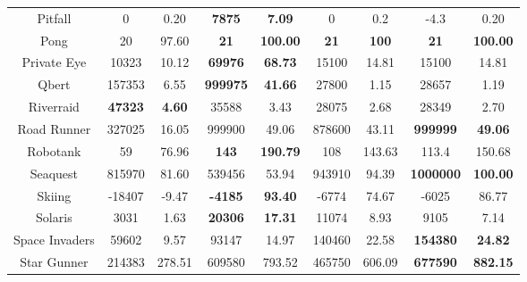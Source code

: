 \documentclass[nohyperref]{article}
\newcommand{\best}[1]{\textbf{#1}}
\theoremstyle{plain}
\begin{document}
\begin{table}[!hb]
\begin{center}
\begin{tabular}{| c | c c |c c |c c |c c |}
 Pitfall        &0             &0.20                   &\textbf{7875}          &\textbf{7.09   }               & 0                 &0.2             &-4.3            &0.20 \\
 Pong           &20            &97.60                       &\textbf{21}            &\textbf{100.00 }               & \best{21}         &\best{100} &\textbf{21}              &\textbf{100.00}          \\
 Private Eye    &10323         &10.12                &\textbf{69976}        &\textbf{68.73  }               & 15100             &14.81               &15100           &14.81 \\
 Qbert          &157353        &6.55                            &\textbf{999975}       &\textbf{41.66  }               & 27800             &1.15     &28657           &1.19       \\
 Riverraid      &\textbf{47323}&\textbf{4.60}               &35588        &3.43               & 28075             &2.68                              &28349           &2.70\\
 Road Runner    &327025        &16.05                        &999900        &49.06                 & 878600           &43.11       &\textbf{999999}          &\textbf{49.06}    \\
 Robotank       &59            &76.96                             &\textbf{143}           &\textbf{190.79 }               & 108         &143.63      &113.4           &150.68          \\
 Seaquest       &815970        &81.60                &539456       &53.94                 &943910	             &94.39       &\textbf{1000000}          &\textbf{100.00}    \\
 Skiing         &-18407        &-9.47                      &\textbf{-4185}        &\textbf{93.40  }               & -6774             &74.67         &-6025	          &86.77      \\
 Solaris        &3031          &1.63                         &\textbf{20306}        &\textbf{17.31  }               & 11074             &8.93        &9105            &7.14        \\
 Space Invaders &59602         &9.57                 &93147                 &14.97                          & 140460     &22.58        &\textbf{154380}          &\textbf{24.82} \\
 Star Gunner    &214383        &278.51   &609580                 &793.52                         &465750     &606.09                  &\textbf{677590}          &\textbf{882.15}\\

\end{tabular}
\end{center}
\end{table}
\end{document}
